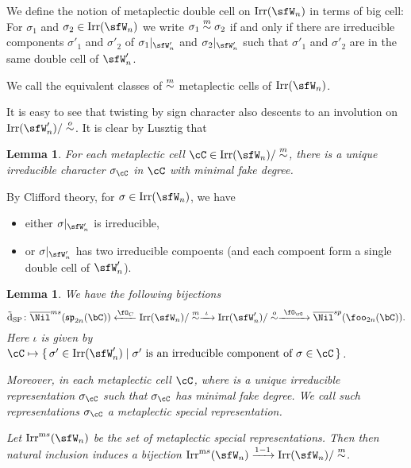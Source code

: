 \documentclass[12pt,a4paper]{amsart}
\def\fsp{\mathfrak{sp}}
\def\fso{\mathfrak{so}}
\numberwithin{equation}{section}
\newtheorem{lem}[thm]{Lemma}
\theoremstyle{remark}
\def\tdSP{\tilde{\mathrm{d}}_{\mathrm{SP}}}
\begin{document}
We define the notion of metaplectic double cell on $\Irr(\sfW_{n})$ in terms of
big cell:
For $\sigma_{1}$ and $\sigma_{2}\in \Irr(\sfW_{n})$ we write $\sigma_{1}\stackrel{m}{\sim} \sigma_{2}$
if and only if there are irreducible components
$\sigma'_{1}$ and $\sigma'_{2}$ of
$\sigma_{1}|_{\sfW'_{n}}$ and $\sigma_{2}|_{\sfW'_{n}}$ such that $\sigma'_{1}$
and $\sigma'_{2}$ are in the same double cell of $\sfW'_{n}$.


We call the equivalent classes of $\stackrel{m}{\sim}$ metaplectic cells of $\Irr(\sfW_{n})$.

It is easy to see that twisting by sign character also descents to an
involution on $\Irr(\sfW'_{n})/\osim$.
It is clear by Lusztig that

\begin{lem}
  For each metaplectic cell $\cC \in \Irr(\sfW_{n})/\msim$, there is a unique
  irreducible character $\sigma_{\cC}$ in $\cC$ with minimal fake degree.
\end{lem}


By Clifford theory, for $\sigma\in \Irr(\sfW_{n})$, we have
\begin{itemize}
        \item
either $\sigma|_{\sfW'_{n}}$ is
        irreducible,
        \item or $\sigma|_{\sfW'_{n}}$ has two irreducible compoents (and each
        compoent form a single double cell of $\sfW'_{n}$).
\end{itemize}


\begin{lem}
  We have the following bijections
  \[
  \tdSP \colon
    \bNil^{ms}(\fsp_{2n}(\bC))\xleftarrow{\Springer_{C}} \Irr(\sfW_{n})/\msim \xrightarrow{\ \iota \ } \Irr(\sfW'_{n})/\osim \xrightarrow{\ \SpringerO \ } \bNil^{sp}(\foo_{2n}(\bC)).
  \]
  Here $\iota$ is given by $\cC\mapsto \set{\sigma'\in \Irr(\sfW'_{n})| \text{$\sigma'$ is an irreducible component of $\sigma\in \cC$}}$.

  Moreover, in each metaplectic cell $\cC$, where is a unique irreducible
  representation $\sigma_{\cC}$ such that $\sigma_{\cC}$ has minimal fake
  degree. We call such representations $\sigma_{\cC}$ a metaplectic special
  representation.

  Let $\Irrms(\sfW_{n})$ be the set of metaplectic special representations.
  Then then natural inclusion induces a bijection
  $\Irrms(\sfW_{n})\xrightarrow{1-1} \Irr(\sfW_{n})/\msim$.
\end{lem}
\end{document}
